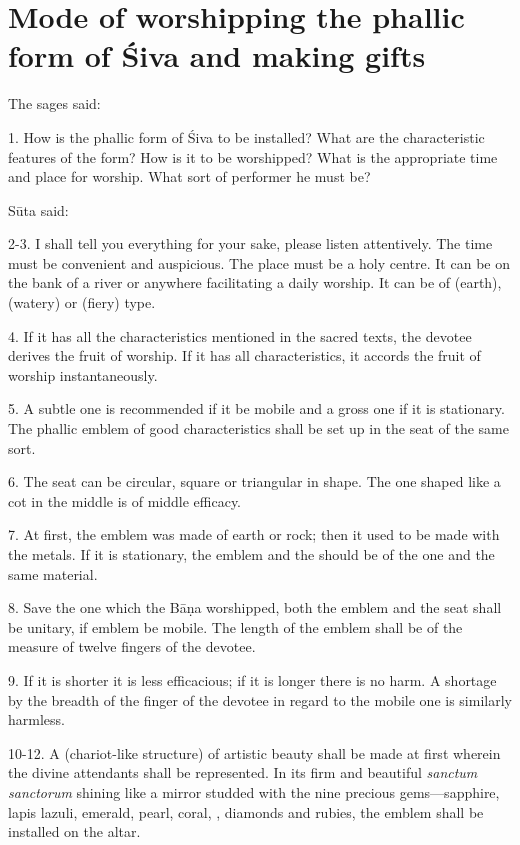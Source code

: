 \chapter{Mode of worshipping the phallic form of Śiva and making gifts}

The sages said:

1. How is the phallic form of Śiva to be installed? What are the characteristic
features of the form? How is it to be worshipped? What is the appropriate time
and place for worship. What sort of performer he must be?

Sūta said:

2-3. I shall tell you everything for your sake, please listen attentively.
The time must be convenient and auspicious. The place must be a holy centre. It
can be on the bank of a river or anywhere facilitating a daily worship. It can
be of  (earth),  (watery) or  (fiery) type.

4. If it has all the characteristics mentioned in the sacred texts, the devotee
derives the fruit of worship. If it has all characteristics, it accords
the fruit of worship instantaneously.

5. A subtle one is recommended if it be mobile and a gross one if it is
stationary. The phallic emblem of good characteristics shall be set up in
the seat of the same sort.

6. The seat can be circular, square or triangular in shape. The one shaped like
a cot in the middle is of middle efficacy.

7. At first, the emblem was made of earth or rock; then it used to be made with
the metals. If it is stationary, the emblem and the  should be of
the one and the same material.

8. Save the one which the  Bāṇa worshipped, both the emblem and
the seat shall be unitary, if emblem be mobile. The length of the emblem shall
be of the measure of twelve fingers of the devotee.

9. If it is shorter it is less efficacious; if it is longer there is no harm.
A shortage by the breadth of the finger of the devotee in regard to the mobile
one is similarly harmless.

10-12. A  (chariot-like structure) of artistic beauty shall be made
at first wherein the divine attendants shall be represented. In its firm and
beautiful \emph{sanctum sanctorum} shining like a mirror studded with the nine
precious gems—sapphire, lapis lazuli, emerald, pearl, coral, ,
diamonds and rubies, the emblem shall be installed on the altar.

